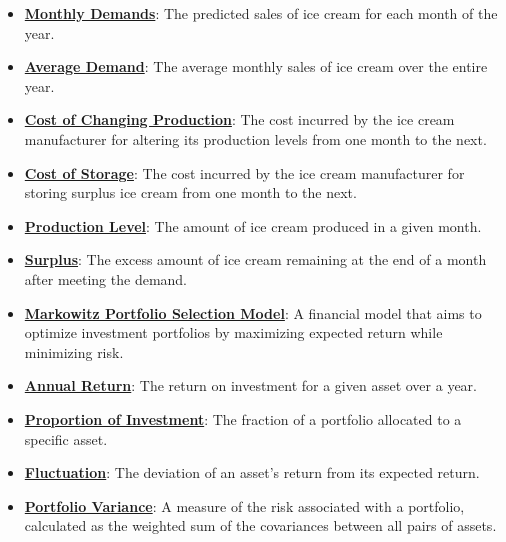 \documentclass{article}%
\begin{document}
\begin{itemize}[leftmargin=*]%
\item \href{https://www.math.purdue.edu/~yipn/421/2024-10-28-ApplsLinProg.pdf#page=1}{\textbf{Monthly Demands}}: The predicted sales of ice cream for each month of the year.%
\item \href{https://www.math.purdue.edu/~yipn/421/2024-10-28-ApplsLinProg.pdf#page=2}{\textbf{Average Demand}}: The average monthly sales of ice cream over the entire year.%
\item \href{https://www.math.purdue.edu/~yipn/421/2024-10-28-ApplsLinProg.pdf#page=3}{\textbf{Cost of Changing Production}}: The cost incurred by the ice cream manufacturer for altering its production levels from one month to the next.%
\item \href{https://www.math.purdue.edu/~yipn/421/2024-10-28-ApplsLinProg.pdf#page=3}{\textbf{Cost of Storage}}: The cost incurred by the ice cream manufacturer for storing surplus ice cream from one month to the next.%
\item \href{https://www.math.purdue.edu/~yipn/421/2024-10-28-ApplsLinProg.pdf#page=3}{\textbf{Production Level}}: The amount of ice cream produced in a given month.%
\item \href{https://www.math.purdue.edu/~yipn/421/2024-10-28-ApplsLinProg.pdf#page=3}{\textbf{Surplus}}: The excess amount of ice cream remaining at the end of a month after meeting the demand.%
\item \href{https://www.math.purdue.edu/~yipn/421/2024-10-28-ApplsLinProg.pdf#page=9}{\textbf{Markowitz Portfolio Selection Model}}: A financial model that aims to optimize investment portfolios by maximizing expected return while minimizing risk.%
\item \href{https://www.math.purdue.edu/~yipn/421/2024-10-28-ApplsLinProg.pdf#page=9}{\textbf{Annual Return}}: The return on investment for a given asset over a year.%
\item \href{https://www.math.purdue.edu/~yipn/421/2024-10-28-ApplsLinProg.pdf#page=9}{\textbf{Proportion of Investment}}: The fraction of a portfolio allocated to a specific asset.%
\item \href{https://www.math.purdue.edu/~yipn/421/2024-10-28-ApplsLinProg.pdf#page=10}{\textbf{Fluctuation}}: The deviation of an asset's return from its expected return.%
\item \href{https://www.math.purdue.edu/~yipn/421/2024-10-28-ApplsLinProg.pdf#page=13}{\textbf{Portfolio Variance}}: A measure of the risk associated with a portfolio, calculated as the weighted sum of the covariances between all pairs of assets.%

\end{itemize}
\end{document}
